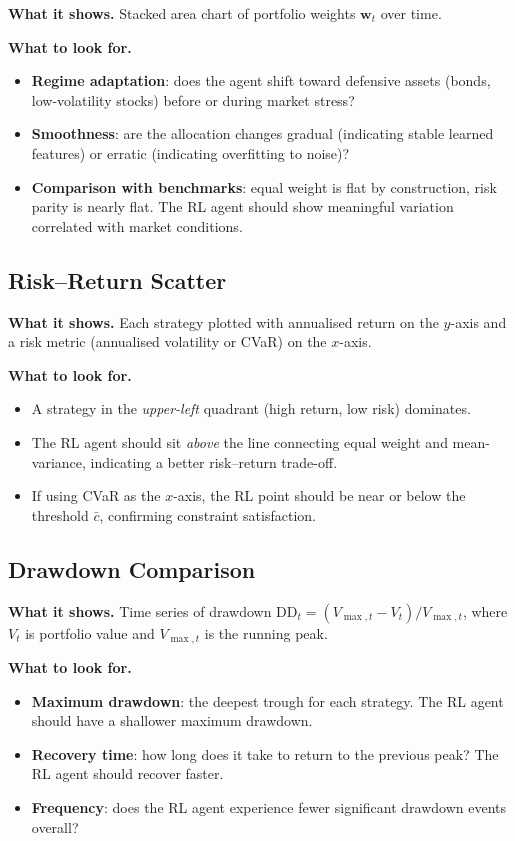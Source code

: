 \documentclass[11pt, a4paper]{article}
\theoremstyle{definition}
\theoremstyle{plain}
\theoremstyle{remark}
\begin{document}
\textbf{What it shows.} Stacked area chart of portfolio weights
$\bm{w}_t$ over time.

\textbf{What to look for.}
\begin{itemize}[leftmargin=2em]
    \item \textbf{Regime adaptation}: does the agent shift toward
          defensive assets (bonds, low-volatility stocks) before or during
          market stress?
    \item \textbf{Smoothness}: are the allocation changes gradual
          (indicating stable learned features) or erratic (indicating
          overfitting to noise)?
    \item \textbf{Comparison with benchmarks}: equal weight is flat by
          construction, risk parity is nearly flat. The RL agent should
          show meaningful variation correlated with market conditions.
\end{itemize}

\subsection{Risk--Return Scatter}

\textbf{What it shows.} Each strategy plotted with annualised return on
the $y$-axis and a risk metric (annualised volatility or CVaR) on the
$x$-axis.

\textbf{What to look for.}
\begin{itemize}[leftmargin=2em]
    \item A strategy in the \emph{upper-left} quadrant (high return, low
          risk) dominates.
    \item The RL agent should sit \emph{above} the line connecting
          equal weight and mean-variance, indicating a better
          risk--return trade-off.
    \item If using CVaR as the $x$-axis, the RL point should be near
          or below the threshold $\bar{c}$, confirming constraint
          satisfaction.
\end{itemize}

\subsection{Drawdown Comparison}

\textbf{What it shows.} Time series of drawdown
$\text{DD}_t = (V_{\max,t} - V_t) / V_{\max,t}$, where $V_t$ is
portfolio value and $V_{\max,t}$ is the running peak.

\textbf{What to look for.}
\begin{itemize}[leftmargin=2em]
    \item \textbf{Maximum drawdown}: the deepest trough for each
          strategy. The RL agent should have a shallower maximum drawdown.
    \item \textbf{Recovery time}: how long does it take to return to the
          previous peak? The RL agent should recover faster.
    \item \textbf{Frequency}: does the RL agent experience fewer
          significant drawdown events overall?
\end{itemize}
\end{document}
